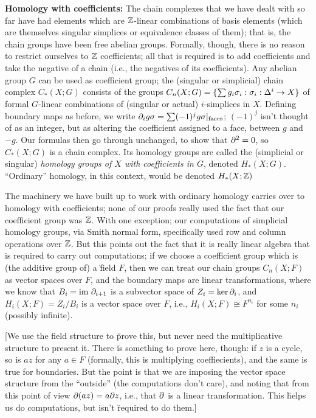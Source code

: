{\bf Homology with coefficients:} The chain complexes that we have dealt with so far have
had elements which are ${\Bbb Z}$-linear combinations of basis elements (which are
themselves singular simplices or equivalence classes of them); that is, the chain
groups have been free abelian groups. Formally, though, there is no reason to restrict
ourselves to ${\Bbb Z}$ coefficients; all that is required is to add
coefficients and take the negative of a chain (i.e., the negatives of its
coefficients). Any abelian group $G$ can be used as coefficient group; the
(singular or simplicial) chain complex $C_*(X;G)$ consists of the groups
$C_n(X;G)=\{\sum g_i\sigma_i : \sigma_i:\Delta^i\rightarrow X\}$ of formal $G$-linear
combinations of (singular or actual) $i$-simplices in $X$. Defining boundary maps
as before, we write $\partial_i g\sigma = \sum (-1)^jg \sigma|_{\text{faces}}$;
$(-1)^j$ isn't thought of as an integer, but as altering the coefficient
assigned to a face, between $g$ and $-g$. Our formulas then go through unchanged,
to show that $\partial^2=0$, so $C_*(X;G)$ is a chain complex. Its homology groups 
are called the (simplicial or singular) {\it homology groups of $X$ with coefficients in $G$},
denoted $H_*(X;G)$. ``Ordinary'' homology, in this context, would be denoted $H_*(X;{\Bbb Z})$

\ssk

The machinery we have built up to work with ordinary homology carries over to homology
with coefficients; none of our proofs really used the fact that our coefficient group was ${\Bbb Z}$.
With one exception; our computations of simplicial homology groups, via Smith normal form,
specifically used row and column operations over ${\Bbb Z}$. But this points out the fact that
it is really linear algebra that is required to carry out computations; if we choose a coefficient
group which is (the additive group of) a \u{field} $F$, then we can treat our chain groups
$C_n(X;F)$ as vector spaces over $F$, and the boundary maps are linear
transformations, where we know that $B_i=\text{im}\ \partial_{i+1}$ is a subvector space of 
$Z_i=\ker\partial_i$, and $H_i(X;F)=Z_i/B_i$ is a vector space over $F$, i.e., 
$H_i(X;F)\cong F^{n_i}$ for some $n_i$ (possibly infinite). 

\vfill
\eject

[We use the field structure to \u{prove} this, but never need the 
multiplicative structure to present it. There \u{is} something to prove
here, though: if $z$ is a cycle, so is $az$ for any $a\in F$ (formally, this is multiplying 
coeffiecients), and the same is true for boundaries. But the point is that we are imposing
the vector space structure from the ``outside'' (the computations don't care), and noting
that from this point of view $\partial(az)=a\partial z$, i.e., that $\partial$ is a linear transformation.
This \u{helps} us do computations, but isn't \u{required} to do them.] 

